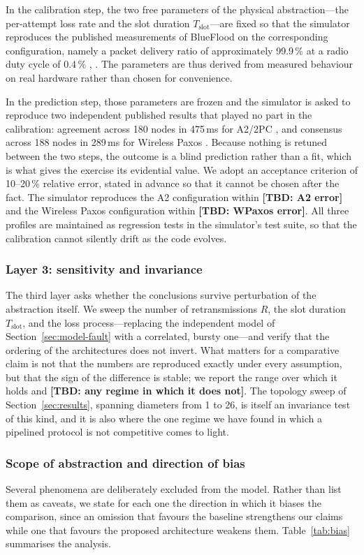 \documentclass[journal]{IEEEtran}
\newcommand{\Nretx}{R}                    %
\newcommand{\Tslot}{T_{\mathrm{slot}}}    %
\newcommand{\TBD}[1]{\textbf{[TBD: #1]}}
\begin{document}
In the calibration step, the two free parameters of the physical
abstraction---the per-attempt loss rate and the slot duration
$\Tslot$---are fixed so that the simulator reproduces the published
measurements of BlueFlood on the corresponding configuration, namely a
packet delivery ratio of approximately 99.9\,\% at a radio duty cycle of
0.4\,\% \cite{alnahas19blueflood}, \cite{alnahas21blueflood}. The
parameters are thus derived from measured behaviour on real hardware
rather than chosen for convenience.

In the prediction step, those parameters are frozen and the simulator is
asked to reproduce two independent published results that played no part
in the calibration: agreement across 180 nodes in 475\,ms for A2/2PC
\cite{alnahas17a2}, and consensus across 188 nodes in 289\,ms for Wireless
Paxos \cite{poirot19paxos}. Because nothing is retuned between the two
steps, the outcome is a blind prediction rather than a fit, which is what
gives the exercise its evidential value. We adopt an acceptance criterion
of 10--20\,\% relative error, stated in advance so that it cannot be
chosen after the fact. The simulator reproduces the A2 configuration
within \TBD{A2 error} and the Wireless Paxos configuration within
\TBD{WPaxos error}. All three profiles are maintained as regression tests
in the simulator's test suite, so that the calibration cannot silently
drift as the code evolves.

\subsubsection{Layer 3: sensitivity and invariance}
The third layer asks whether the conclusions survive perturbation of the
abstraction itself. We sweep the number of retransmissions $\Nretx$, the
slot duration $\Tslot$, and the loss process---replacing the
independent model of Section~\ref{sec:model-fault} with a correlated,
bursty one---and verify that the ordering of the architectures does not
invert. What matters for a comparative claim is not that the numbers are
reproduced exactly under every assumption, but that the sign of the
difference is stable; we report the range over which it holds and
\TBD{any regime in which it does not}. The topology sweep of
Section~\ref{sec:results}, spanning diameters from 1 to 26, is itself an
invariance test of this kind, and it is also where the one regime we have
found in which a pipelined protocol is not competitive comes to light.

\subsubsection{Scope of abstraction and direction of bias}
Several phenomena are deliberately excluded from the model. Rather than
list them as caveats, we state for each one the direction in which it
biases the comparison, since an omission that favours the baseline
strengthens our claims while one that favours the proposed architecture
weakens them. Table~\ref{tab:bias} summarises the analysis.
\end{document}
